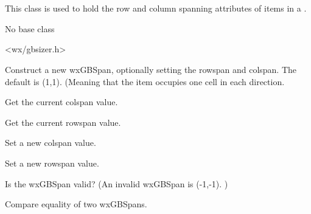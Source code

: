 
\section{}\label{wxgbspan}

This class is used to hold the row and column spanning attributes of
items in a .


No base class


<wx/gbsizer.h>


\label{wxgbspanwxgbspan}



Construct a new wxGBSpan, optionally setting the rowspan and colspan.
The default is (1,1).  (Meaning that the item occupies one cell in
each direction.

\label{wxgbspangetcolspan}


Get the current colspan value.

\label{wxgbspangetrowspan}


Get the current rowspan value.

\label{wxgbspansetcolspan}


Set a new colspan value.

\label{wxgbspansetrowspan}


Set a new rowspan value.

\label{wxgbspanoperatorunknown}


Is the wxGBSpan valid?  (An invalid wxGBSpan is (-1,-1). )

\label{wxgbspanoperatorequal}


Compare equality of two wxGBSpans.

